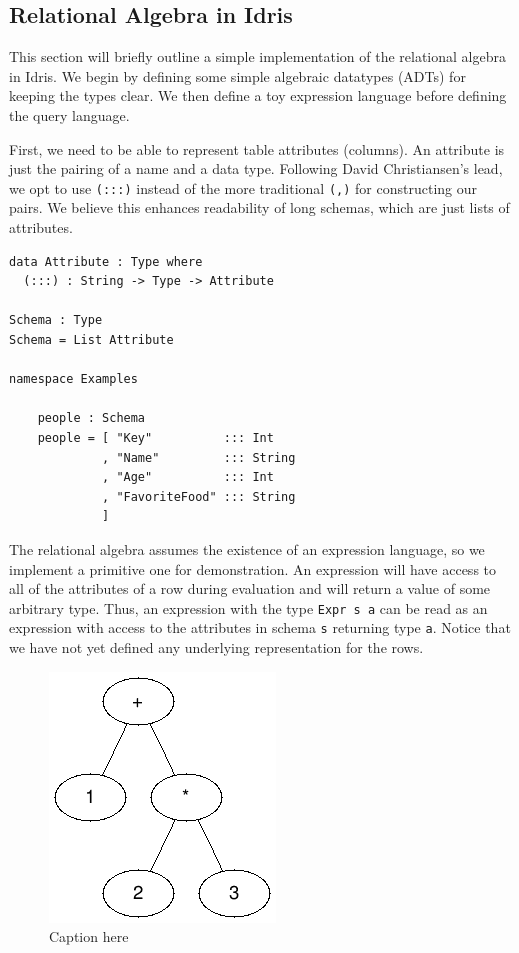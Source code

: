 \documentclass[12pt]{article}
\begin{document}
\subsection{Relational Algebra in Idris}

This section will briefly outline a simple implementation of the relational algebra in Idris.
We begin by defining some simple algebraic datatypes (ADTs) for keeping the types clear.
We then define a toy expression language before defining the query language.

First, we need to be able to represent table attributes (columns).
An attribute is just the pairing of a name and a data type.
Following David Christiansen's lead, we opt to use \texttt{(:::)} instead of the more traditional \texttt{(,)} for constructing our pairs.
We believe this enhances readability of long schemas, which are just lists of attributes.

\begin{lstlisting}
data Attribute : Type where
  (:::) : String -> Type -> Attribute

Schema : Type
Schema = List Attribute

namespace Examples

    people : Schema
    people = [ "Key"          ::: Int 
             , "Name"         ::: String
             , "Age"          ::: Int
             , "FavoriteFood" ::: String
             ]
\end{lstlisting}

The relational algebra assumes the existence of an expression language, so we implement a primitive one for demonstration.
An expression will have access to all of the attributes of a row during evaluation and will return a value of some arbitrary type.
Thus, an expression with the type \texttt{Expr s a} can be read as an expression with access to the attributes in schema \texttt{s} returning type \texttt{a}.
Notice that we have not yet defined any underlying representation for the rows.

\begin{figure}[tb]
    \centering
    \includegraphics[]{assets/expr_tree.png}
    \caption{Caption here}
    \label{fig:figure1}
\end{figure}
\end{document}
